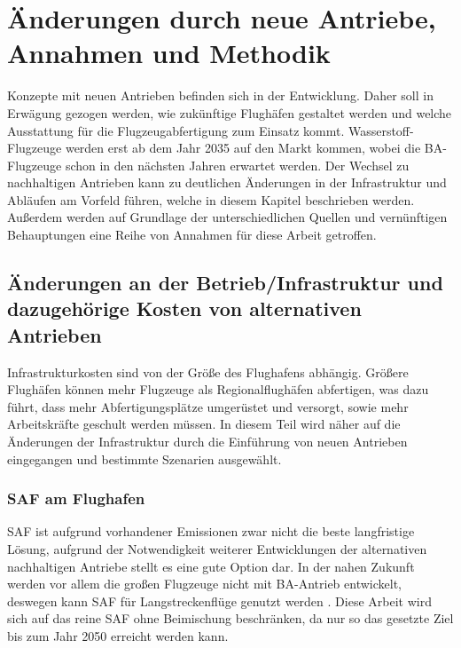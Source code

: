 \chapter{Änderungen durch neue Antriebe, Annahmen und Methodik}
\label{ch:Änderungen durch neue Antriebe, Annahmen und Methodik}

Konzepte mit neuen Antrieben befinden sich in der Entwicklung.
Daher soll in Erwägung gezogen werden, wie zukünftige Flughäfen 
gestaltet werden und welche Ausstattung für 
die Flugzeugabfertigung zum Einsatz kommt. %
Wasserstoff-Flugzeuge werden erst ab dem Jahr 2035 auf den Markt kommen, 
wobei die BA-Flugzeuge schon in den nächsten Jahren erwartet werden.
Der Wechsel zu nachhaltigen Antrieben kann zu deutlichen Änderungen 
in der Infrastruktur und Abläufen am Vorfeld führen, 
welche in diesem Kapitel beschrieben werden.
Außerdem werden auf Grundlage der unterschiedlichen Quellen und 
vernünftigen Behauptungen eine Reihe von Annahmen für diese Arbeit getroffen.
%

\section{Änderungen an der Betrieb/Infrastruktur und dazugehörige Kosten von alternativen Antrieben}
\label{s:Änderungen an der Abfertigung und dazugehörige Kosten von alternativen Antrieben}

Infrastrukturkosten sind von der Größe des Flughafens abhängig. 
Größere Flughäfen können mehr Flugzeuge als Regionalflughäfen abfertigen, 
was dazu führt, dass mehr Abfertigungsplätze umgerüstet und versorgt, 
sowie mehr Arbeitskräfte geschult werden müssen. 
In diesem Teil wird näher auf die Änderungen der Infrastruktur durch 
die Einführung von neuen Antrieben eingegangen und bestimmte Szenarien ausgewählt.

\subsection{SAF am Flughafen}
SAF ist aufgrund vorhandener Emissionen zwar nicht die beste langfristige Lösung, 
aufgrund der Notwendigkeit weiterer Entwicklungen der alternativen nachhaltigen 
Antriebe stellt es eine gute Option dar. 
In der nahen Zukunft werden vor allem die großen Flugzeuge nicht mit BA-Antrieb entwickelt, 
deswegen kann SAF für Langstreckenflüge genutzt werden \cite{dalmia2022powering}.
Diese Arbeit wird sich auf das reine SAF ohne Beimischung beschränken, 
da nur so das gesetzte Ziel bis zum Jahr 2050 erreicht werden kann.

